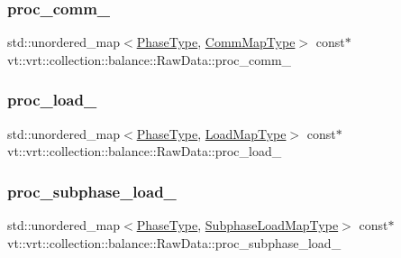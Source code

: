 \subsubsection{\texorpdfstring{proc\+\_\+comm\+\_\+}{proc\_comm\_}}
{\footnotesize\ttfamily std\+::unordered\+\_\+map$<$\hyperlink{namespacevt_a46ce6733d5cdbd735d561b7b4029f6d7}{Phase\+Type}, \hyperlink{namespacevt_1_1vrt_1_1collection_1_1balance_a10860c956804d644db54a16012352728}{Comm\+Map\+Type}$>$ const$\ast$ vt\+::vrt\+::collection\+::balance\+::\+Raw\+Data\+::proc\+\_\+comm\+\_\+}

\mbox{\label{structvt_1_1vrt_1_1collection_1_1balance_1_1_raw_data_a8ba841120376e38c83484365b57fc719}} 
\subsubsection{\texorpdfstring{proc\+\_\+load\+\_\+}{proc\_load\_}}
{\footnotesize\ttfamily std\+::unordered\+\_\+map$<$\hyperlink{namespacevt_a46ce6733d5cdbd735d561b7b4029f6d7}{Phase\+Type}, \hyperlink{namespacevt_1_1vrt_1_1collection_1_1balance_a45306ee4bf38fe3fb586d1ee2fa3d147}{Load\+Map\+Type}$>$ const$\ast$ vt\+::vrt\+::collection\+::balance\+::\+Raw\+Data\+::proc\+\_\+load\+\_\+}

\mbox{\label{structvt_1_1vrt_1_1collection_1_1balance_1_1_raw_data_afc0c2273b3e7987e386c5d1b77289413}} 
\subsubsection{\texorpdfstring{proc\+\_\+subphase\+\_\+load\+\_\+}{proc\_subphase\_load\_}}
{\footnotesize\ttfamily std\+::unordered\+\_\+map$<$\hyperlink{namespacevt_a46ce6733d5cdbd735d561b7b4029f6d7}{Phase\+Type}, \hyperlink{namespacevt_1_1vrt_1_1collection_1_1balance_a3d91523158c1025b7b665240072f3b7e}{Subphase\+Load\+Map\+Type}$>$ const$\ast$ vt\+::vrt\+::collection\+::balance\+::\+Raw\+Data\+::proc\+\_\+subphase\+\_\+load\+\_\+}



